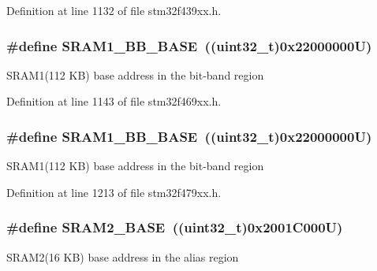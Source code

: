 Definition at line 1132 of file stm32f439xx.\+h.

\subsubsection[{\texorpdfstring{S\+R\+A\+M1\+\_\+\+B\+B\+\_\+\+B\+A\+SE}{SRAM1_BB_BASE}}]{\setlength{\rightskip}{0pt plus 5cm}\#define S\+R\+A\+M1\+\_\+\+B\+B\+\_\+\+B\+A\+SE~((uint32\+\_\+t)0x22000000\+U)}\hypertarget{group___peripheral__memory__map_gac4c4f61082e4b168f29d9cf97dc3ca5c}{}\label{group___peripheral__memory__map_gac4c4f61082e4b168f29d9cf97dc3ca5c}
S\+R\+A\+M1(112 K\+B) base address in the bit-\/band region 

Definition at line 1143 of file stm32f469xx.\+h.

\subsubsection[{\texorpdfstring{S\+R\+A\+M1\+\_\+\+B\+B\+\_\+\+B\+A\+SE}{SRAM1_BB_BASE}}]{\setlength{\rightskip}{0pt plus 5cm}\#define S\+R\+A\+M1\+\_\+\+B\+B\+\_\+\+B\+A\+SE~((uint32\+\_\+t)0x22000000\+U)}\hypertarget{group___peripheral__memory__map_gac4c4f61082e4b168f29d9cf97dc3ca5c}{}\label{group___peripheral__memory__map_gac4c4f61082e4b168f29d9cf97dc3ca5c}
S\+R\+A\+M1(112 K\+B) base address in the bit-\/band region 

Definition at line 1213 of file stm32f479xx.\+h.

\subsubsection[{\texorpdfstring{S\+R\+A\+M2\+\_\+\+B\+A\+SE}{SRAM2_BASE}}]{\setlength{\rightskip}{0pt plus 5cm}\#define S\+R\+A\+M2\+\_\+\+B\+A\+SE~((uint32\+\_\+t)0x2001\+C000\+U)}\hypertarget{group___peripheral__memory__map_gadbb42a3d0a8a90a79d2146e4014241b1}{}\label{group___peripheral__memory__map_gadbb42a3d0a8a90a79d2146e4014241b1}
S\+R\+A\+M2(16 K\+B) base address in the alias region 

